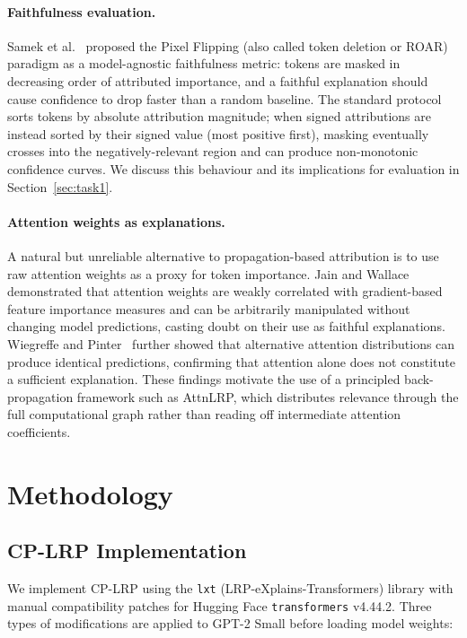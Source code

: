 \documentclass[10pt,twocolumn,letterpaper]{article}
\begin{document}
\paragraph{Faithfulness evaluation.}
Samek et al.~\cite{samek2017evaluating} proposed the Pixel Flipping (also
called token deletion or ROAR) paradigm as a model-agnostic faithfulness
metric: tokens are masked in decreasing order of attributed importance, and a
faithful explanation should cause confidence to drop faster than a random
baseline.
The standard protocol sorts tokens by absolute attribution magnitude; when
signed attributions are instead sorted by their signed value (most positive
first), masking eventually crosses into the negatively-relevant region and
can produce non-monotonic confidence curves.
We discuss this behaviour and its implications for evaluation in
Section~\ref{sec:task1}.

\paragraph{Attention weights as explanations.}
A natural but unreliable alternative to propagation-based attribution is to
use raw attention weights as a proxy for token importance.
Jain and Wallace~\cite{jain2019attention} demonstrated that attention weights
are weakly correlated with gradient-based feature importance measures and can
be arbitrarily manipulated without changing model predictions, casting doubt
on their use as faithful explanations.
Wiegreffe and Pinter~\cite{wiegreffe2019attention} further showed that
alternative attention distributions can produce identical predictions,
confirming that attention alone does not constitute a sufficient explanation.
These findings motivate the use of a principled back-propagation framework
such as AttnLRP, which distributes relevance through the full computational
graph rather than reading off intermediate attention coefficients.

\section{Methodology}
\label{sec:method}

\subsection{CP-LRP Implementation}

We implement CP-LRP using the \texttt{lxt} (LRP-eXplains-Transformers) library
with manual compatibility patches for Hugging Face \texttt{transformers}
v4.44.2.
Three types of modifications are applied to GPT-2 Small before loading model
weights:
\end{document}
